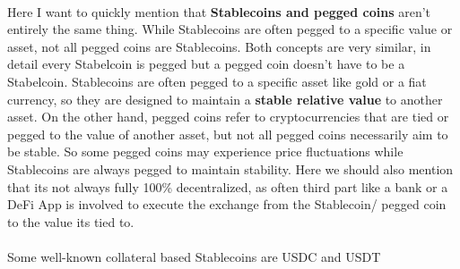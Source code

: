 \documentclass{article}
\begin{document}
\\
Here I want to quickly mention that \textbf{Stablecoins and pegged coins} aren't entirely the same thing. While Stablecoins are often pegged to a specific value or asset, not all pegged coins are Stablecoins. Both concepts are very similar, in detail every Stabelcoin is pegged but a pegged coin doesn't have to be a Stabelcoin. Stablecoins are often pegged to a specific asset like gold or a fiat currency, so they are designed to maintain a \textbf{stable relative value} to another asset. On the other hand, pegged coins refer to cryptocurrencies that are tied or pegged to the value of another asset, but not all pegged coins necessarily aim to be stable. So some pegged coins may experience price fluctuations while Stablecoins are always pegged to maintain stability. Here we should also mention that its not always fully 100\% decentralized, as often  third part like a bank or a DeFi App is involved to execute the exchange from the Stablecoin/ pegged coin  to the value its tied to.\\
\\
Some well-known collateral based Stablecoins are USDC and USDT%
\end{document}
